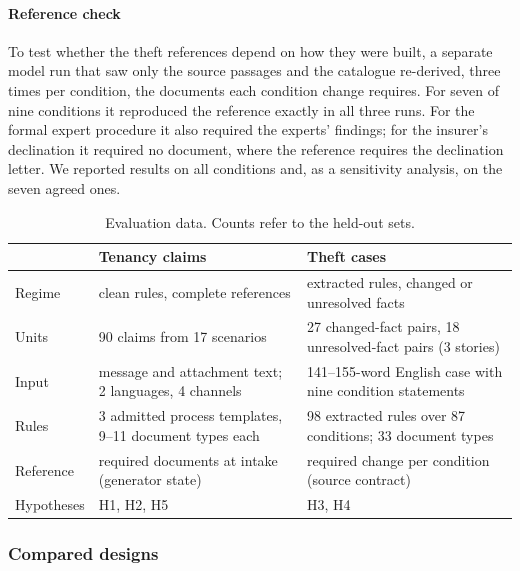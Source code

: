 \paragraph{Reference check}
To test whether the theft references depend on how they were built, a separate model run that saw only the source passages and the catalogue re-derived, three times per condition, the documents each condition change requires. For seven of nine conditions it reproduced the reference exactly in all three runs. For the formal expert procedure it also required the experts' findings; for the insurer's declination it required no document, where the reference requires the declination letter. We reported results on all conditions and, as a sensitivity analysis, on the seven agreed ones.

\begin{table}[t]
\caption{Evaluation data. Counts refer to the held-out sets.}
\label{tab:data}
\small
\begin{tabularx}{\linewidth}{@{}lXX@{}}
\toprule
& Tenancy claims & Theft cases \\
\midrule
Regime & clean rules, complete references & extracted rules, changed or unresolved facts \\
Units & 90 claims from 17 scenarios & 27 changed-fact pairs, 18 unresolved-fact pairs (3 stories) \\
Input & message and attachment text; 2 languages, 4 channels & 141--155-word English case with nine condition statements \\
Rules & 3 admitted process templates, 9--11 document types each & 98 extracted rules over 87 conditions; 33 document types \\
Reference & required documents at intake (generator state) & required change per condition (source contract) \\
Hypotheses & H1, H2, H5 & H3, H4 \\
\bottomrule
\end{tabularx}
\end{table}

\subsubsection{Compared designs}
\label{sec:designs}

